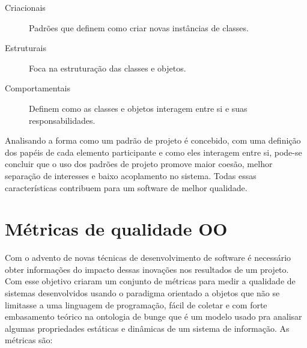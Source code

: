 \begin{description}
\item[Criacionais] Padrões que definem como criar novas instâncias de classes.
\item[Estruturais] Foca na estruturação das classes e objetos.
\item[Comportamentais] Definem como as classes e objetos interagem entre si e
suas responsabilidades.
\end{description}

Analisando a forma como um padrão de projeto é concebido, com uma definição
dos papéis de cada elemento participante e como eles interagem entre si,
pode-se concluir que o uso dos padrões de projeto promove maior coesão, melhor
separação de interesses e baixo acoplamento no sistema. Todas essas
características contribuem para um software de melhor qualidade.




\section{Métricas de qualidade OO}
\label{sec:metrics}




Com o advento de novas técnicas de desenvolvimento de software é necessário
obter informações do impacto dessas inovações nos resultados de um projeto. Com
esse objetivo  criaram um conjunto de métricas para
medir a qualidade de sistemas desenvolvidos usando o paradigma orientado a
objetos que não se limitasse a uma linguagem de programação, fácil de coletar e
com forte embasamento teórico na ontologia de bunge que é um modelo usado pra
analisar algumas propriedades estáticas e dinâmicas de um sistema de
informação\cite{WandWeber}. As métricas são:




